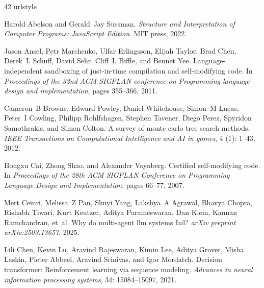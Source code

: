 \begin{thebibliography}{42}
\providecommand{\natexlab}[1]{#1}
\providecommand{\url}[1]{\texttt{#1}}
\expandafter\ifx\csname urlstyle\endcsname\relax
  \providecommand{\doi}[1]{doi: #1}\else
  \providecommand{\doi}{doi: \begingroup \urlstyle{rm}\Url}\fi

Harold Abelson and Gerald~Jay Sussman.
\newblock \emph{Structure and Interpretation of Computer Programs: JavaScript Edition}.
\newblock MIT press, 2022.

Jason Ansel, Petr Marchenko, Ulfar Erlingsson, Elijah Taylor, Brad Chen, Derek~L Schuff, David Sehr, Cliff~L Biffle, and Bennet Yee.
\newblock Language-independent sandboxing of just-in-time compilation and self-modifying code.
\newblock In \emph{Proceedings of the 32nd ACM SIGPLAN conference on Programming language design and implementation}, pages 355--366, 2011.

Cameron~B Browne, Edward Powley, Daniel Whitehouse, Simon~M Lucas, Peter~I Cowling, Philipp Rohlfshagen, Stephen Tavener, Diego Perez, Spyridon Samothrakis, and Simon Colton.
\newblock A survey of monte carlo tree search methods.
\newblock \emph{IEEE Transactions on Computational Intelligence and AI in games}, 4 (1): 1--43, 2012.

Hongxu Cai, Zhong Shao, and Alexander Vaynberg.
\newblock Certified self-modifying code.
\newblock In \emph{Proceedings of the 28th ACM SIGPLAN Conference on Programming Language Design and Implementation}, pages 66--77, 2007.

Mert Cemri, Melissa~Z Pan, Shuyi Yang, Lakshya~A Agrawal, Bhavya Chopra, Rishabh Tiwari, Kurt Keutzer, Aditya Parameswaran, Dan Klein, Kannan Ramchandran, et~al.
\newblock Why do multi-agent llm systems fail?
\newblock \emph{arXiv preprint arXiv:2503.13657}, 2025.

Lili Chen, Kevin Lu, Aravind Rajeswaran, Kimin Lee, Aditya Grover, Misha Laskin, Pieter Abbeel, Aravind Srinivas, and Igor Mordatch.
\newblock Decision transformer: Reinforcement learning via sequence modeling.
\newblock \emph{Advances in neural information processing systems}, 34: 15084--15097, 2021.


\end{thebibliography}
